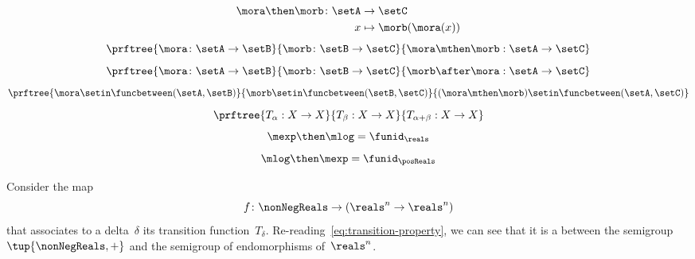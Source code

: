 {\begin{forslides}
\begin{equation}
            \label{eq:funcomposition}
            \begin{aligned}
                \mora \then \morb \colon \setA & \to  \setC \\
                x                              & \mapsto \morb(\mora(x))
            \end{aligned}
        \end{equation}
        \begin{equation}
            \label{eq:funccomp1}
            \prftree{\mora \colon \setA \to \setB}{\morb \colon \setB \to \setC}{\mora \mthen \morb : \setA \to \setC}
        \end{equation}
        \begin{equation}
            \label{eq:funccomp2}
            \prftree{\mora \colon \setA \to \setB}{\morb \colon \setB \to \setC}{\morb \after \mora : \setA \to \setC}
        \end{equation}
        \begin{equation}
            \label{eq:funccomp3}
            \prftree{%
                \mora \setin \funcbetween(\setA, \setB)}{%
                \morb \setin \funcbetween( \setB, \setC)}{
                (\mora \mthen \morb) \setin \funcbetween( \setA, \setC)}
        \end{equation}
        \begin{equation}
            \label{eq:transitions}
            \prftree{T_\alpha: X \to X }{T_\beta : X \to X}{T_{\alpha+\beta} : X \to X}
        \end{equation}
        \begin{equation}
            \label{eq:explogid}
            \mexp \then \mlog = \funid_{\reals}
        \end{equation}
        \begin{equation}
            \label{eq:logexpid}
            \mlog \then \mexp = \funid_{\posReals}
        \end{equation}
    \end{forslides}
}%

\begin{example}
    Consider the map
    \begin{equation*}
        f\colon \nonNegReals \to (\reals^n \to \reals^n)
    \end{equation*}
    that associates to a delta~$\delta$ its transition function~$T_\delta$.
    Re-reading~\cref{eq:transition-property}, we can see that it is a \whomo between the semigroup~$\tup{\nonNegReals,+}$ and the semigroup of endomorphisms of~$\reals^n$.
\end{example}

